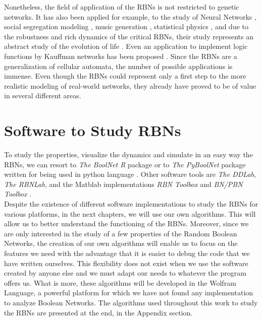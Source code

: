 Nonetheless, the field of application of the RBNs is not restricted to genetic networks. It has also been applied for example, to the study of Neural Networks \cite{neural_rbn}, social segregation modeling \cite{social_rbn}, music generation \cite{music_rbn}, statistical physics \cite{spin_rbn}, and due to the robustness and rich dynamics of the critical RBNs, their study represents an abstract study of the evolution of life \cite{guiding_rbn}. Even an application to implement logic functions by Kauffman networks has been proposed \cite{kauffman_analysis_applications}. Since the RBNs are a generalization of cellular automata, the number of possible applications is immense. Even though the RBNs could represent only a first step to the more realistic modeling of real-world networks, they already have proved to be of value in several different areas.

\section{Software to Study RBNs}
To study the properties, visualize the dynamics and simulate in an easy way the RBNs, we can resort to \textit{The BoolNet R} package \cite{attractors} or to \textit{The PyBoolNet} package written for being used in python language \cite{pyboolnet}. Other software tools are \textit{The DDLab}, \textit{The RBNLab}, and the Matblab implementations \textit{RBN Toolbox} and \textit{BN/PBN Toolbox} \cite{rbn_carlos}.\\

Despite the existence of different software implementations to study the RBNs for various platforms, in the next chapters, we will use our own algorithms. This will allow us to better understand the functioning of the RBNs. Moreover, since we are only interested in the study of a few properties of the Random Boolean Networks, the creation of our own algorithms will enable us to focus on the features we need with the advantage that it is easier to debug the code that we have written ourselves. This flexibility does not exist when we use the software created by anyone else and we must adapt our needs to whatever the program offers us.
What is more, these algorithms will be developed in the Wolfram Language, a powerful platform for which we have not found any implementation to analyze Boolean Networks. The algorithms used throughout this work to study the RBNs are presented at the end, in the Appendix section.